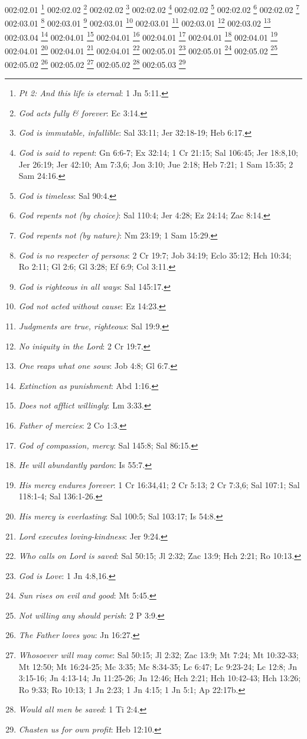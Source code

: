 {{002:02.01 \footnote{\textit{Pt 2: And this life is eternal}: 1 Jn 5:11.}
002:02.02 \footnote{\textit{God acts fully & forever}: Ec 3:14.}
002:02.02 \footnote{\textit{God is immutable, infallible}: Sal 33:11; Jer 32:18-19; Heb 6:17.}
002:02.02 \footnote{\textit{God is said to repent}: Gn 6:6-7; Ex 32:14; 1 Cr 21:15; Sal 106:45; Jer 18:8,10; Jer 26:19; Jer 42:10; Am 7:3,6; Jon 3:10; Jue 2:18; Heb 7:21; 1 Sam 15:35; 2 Sam 24:16.}
002:02.02 \footnote{\textit{God is timeless}: Sal 90:4.}
002:02.02 \footnote{\textit{God repents not (by choice)}: Sal 110:4; Jer 4:28; Ez 24:14; Zac 8:14.}
002:02.02 \footnote{\textit{God repents not (by nature)}: Nm 23:19; 1 Sam 15:29.}
002:03.01 \footnote{\textit{God is no respecter of persons}: 2 Cr 19:7; Job 34:19; Eclo 35:12; Hch 10:34; Ro 2:11; Gl 2:6; Gl 3:28; Ef 6:9; Col 3:11.}
002:03.01 \footnote{\textit{God is righteous in all ways}: Sal 145:17.}
002:03.01 \footnote{\textit{God not acted without cause}: Ez 14:23.}
002:03.01 \footnote{\textit{Judgments are true, righteous}: Sal 19:9.}
002:03.01 \footnote{\textit{No iniquity in the Lord}: 2 Cr 19:7.}
002:03.02 \footnote{\textit{One reaps what one sows}: Job 4:8; Gl 6:7.}
002:03.04 \footnote{\textit{Extinction as punishment}: Abd 1:16.}
002:04.01 \footnote{\textit{Does not afflict willingly}: Lm 3:33.}
002:04.01 \footnote{\textit{Father of mercies}: 2 Co 1:3.}
002:04.01 \footnote{\textit{God of compassion, mercy}: Sal 145:8; Sal 86:15.}
002:04.01 \footnote{\textit{He will abundantly pardon}: Is 55:7.}
002:04.01 \footnote{\textit{His mercy endures forever}: 1 Cr 16:34,41; 2 Cr 5:13; 2 Cr 7:3,6; Sal 107:1; Sal 118:1-4; Sal 136:1-26.}
002:04.01 \footnote{\textit{His mercy is everlasting}: Sal 100:5; Sal 103:17; Is 54:8.}
002:04.01 \footnote{\textit{Lord executes loving-kindness}: Jer 9:24.}
002:04.01 \footnote{\textit{Who calls on Lord is saved}: Sal 50:15; Jl 2:32; Zac 13:9; Hch 2:21; Ro 10:13.}
002:05.01 \footnote{\textit{God is Love}: 1 Jn 4:8,16.}
002:05.01 \footnote{\textit{Sun rises on evil and good}: Mt 5:45.}
002:05.02 \footnote{\textit{Not willing any should perish}: 2 P 3:9.}
002:05.02 \footnote{\textit{The Father loves you}: Jn 16:27.}
002:05.02 \footnote{\textit{Whosoever will may come}: Sal 50:15; Jl 2:32; Zac 13:9; Mt 7:24; Mt 10:32-33; Mt 12:50; Mt 16:24-25; Mc 3:35; Mc 8:34-35; Lc 6:47; Lc 9:23-24; Lc 12:8; Jn 3:15-16; Jn 4:13-14; Jn 11:25-26; Jn 12:46; Hch 2:21; Hch 10:42-43; Hch 13:26; Ro 9:33; Ro 10:13; 1 Jn 2:23; 1 Jn 4:15; 1 Jn 5:1; Ap 22:17b.}
002:05.02 \footnote{\textit{Would all men be saved}: 1 Ti 2:4.}
002:05.03 \footnote{\textit{Chasten us for own profit}: Heb 12:10.}
}}
